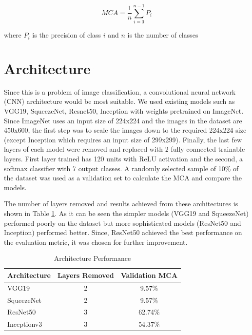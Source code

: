 \documentclass[conference]{IEEEtran}
\begin{document}
\begin{equation}
MCA = \frac{1}{n}\sum_{i=0}^{n-1}{P_i}
\label{eq1}
\end{equation}

where $P_i$ is the precision of class $i$ and $n$ is the number of classes


    \section{Architecture}\label{architecture}

Since this is a problem of image classification, a convolutional neural
network (CNN) architecture would be most suitable. We used existing
models such as VGG19\cite{simonyan2014deep}, SqueezeNet\cite{DBLP:journals/corr/IandolaMAHDK16}, Resnet50\cite{DBLP:journals/corr/HeZRS15},
Inception\cite{DBLP:journals/corr/SzegedyLJSRAEVR14} with weights pretrained on ImageNet\cite{russakovsky2015imagenet}\cite{lee2017tensornets}. 
Since ImageNet uses an input size of 224x224 and the images in the
dataset are 450x600, the first step was to scale the images down to the
required 224x224 size (except Inception which requires an input size of 299x299). 
Finally, the last few layers of each model were removed and replaced with 2 fully connected trainable layers. 
First layer trained has 120 units with ReLU activation and the second, a softmax classifier with 7 output classes. 
A randomly selected sample of 10\% of the dataset was used as a validation set to calculate the MCA and compare the models.

The number of layers removed and results achieved from these architectures is shown in Table \ref{tab1}. As it can be seen the simpler models (VGG19 and SqueezeNet) performed poorly on the dataset but more sophisticated models (ResNet50 and Inception) performed better. Since, ResNet50 achieved the best performance on the evaluation metric, it was chosen for further improvement.


\begin{table}[htbp]
\caption{Architecture Performance}
\begin{center}
\begin{tabular}{|l|c|c|}
\hline
\textbf{Architecture} & \textbf{Layers Removed} & \textbf{Validation MCA}\\
\hline
VGG19 & 2 & 9.57\%\\
\hline
SqueezeNet & 2 & 9.57\%\\
\hline
ResNet50 & 3 & 62.74\%\\
\hline
Inceptionv3 & 3 & 54.37\%\\
\hline
\end{tabular}
\label{tab1}
\end{center}
\end{table}
\end{document}
